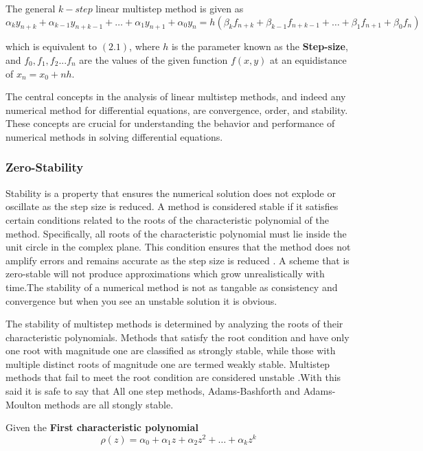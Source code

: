 The general $k-step$ linear multistep method is given as 
\begin{equation}
  \alpha_k y_{n+k} + \alpha_{k-1} y_{n+k-1} + \ldots + \alpha_1 y_{n+1} + \alpha_0 y_n = h \left( \beta_k f_{n+k} + \beta_{k-1} f_{n+k-1} + \ldots + \beta_1 f_{n+1} + \beta_0 f_n \right)
\end{equation}

 which is equivalent to $(2.1)$, where $h$ is the parameter known as the \textbf{Step-size}, and $f_0, f_1, f_2 ... f_n$ are the values of the given function $f(x,y)$ at an equidistance of  $x_n = x_0 + nh$.

 The central concepts in the analysis of linear multistep methods, and indeed any numerical method for differential equations, are convergence, order, and stability. These concepts are crucial for understanding the behavior and performance of numerical methods in solving differential equations.

 \subsubsection*{Zero-Stability}
 Stability is a property that ensures the numerical solution does not explode or oscillate as the step size is reduced. A method is considered stable if it satisfies certain conditions related to the roots of the characteristic polynomial of the method. Specifically, all roots of the characteristic polynomial must lie inside the unit circle in the complex plane. This condition ensures that the method does not amplify errors and remains accurate as the step size is reduced \cite{wiki:analysis} \cite{Alexanderian2022}. A scheme that is zero-stable will not produce approximations which grow unrealistically with time.The stability of a numerical method is not as tangable as consistency and convergence but when you see an unstable solution it is obvious.

 The stability of multistep methods is determined by analyzing the roots of their characteristic polynomials. Methods that satisfy the root condition and have only one root with magnitude one are classified as strongly stable, while those with multiple distinct roots of magnitude one are termed weakly stable. Multistep methods that fail to meet the root condition are considered unstable \cite{butler_numerical_2022}.With this said it is safe to say that All one step methods, Adams-Bashforth and Adams-Moulton methods are all stongly stable.

 Given the \textbf{First characteristic polynomial} 
 \begin{equation}
  \rho(z) = \alpha_0 + \alpha_1 z + \alpha_2 z^2 + \dots + \alpha_k z^k
 \end{equation}

